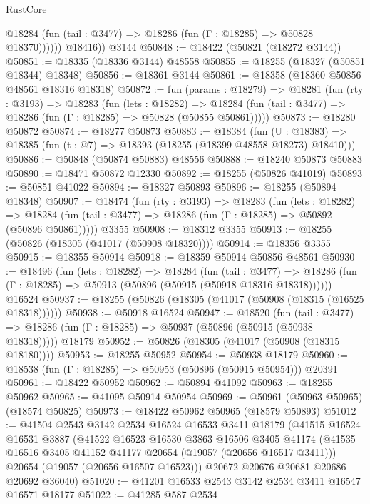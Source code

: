 \begin{lexlean}{RustCore}
\begin{coremodule}
              @18284 (fun (tail : @3477) => @18286 (fun (Γ : @18285) => @50828 @18370))))))
        @18416))
    @3144
@50848 := @18422 (@50821 (@18272 @3144))
@50851 := @18335 (@18336 @3144) @48558
@50855 := @18255 (@18327 (@50851 @18344) @18348)
@50856 := @18361 @3144
@50861 := @18358 (@18360 @50856 @48561 @18316 @18318)
@50872 := fun (params : @18279) =>
  @18281
    (fun (rty : @3193) =>
    @18283
      (fun (lets : @18282) =>
      @18284 (fun (tail : @3477) => @18286 (fun (Γ : @18285) => @50828 (@50855 @50861)))))
@50873 := @18280 @50872
@50874 := @18277 @50873
@50883 := @18384
    (fun (U : @18383) => @18385 (fun (t : @7) => @18393 (@18255 (@18399 @48558 @18273) @18410)))
@50886 := @50848 (@50874 @50883) @48556
@50888 := @18240 @50873 @50883
@50890 := @18471 @50872 @12330
@50892 := @18255 (@50826 @41019)
@50893 := @50851 @41022
@50894 := @18327 @50893
@50896 := @18255 (@50894 @18348)
@50907 := @18474
    (fun (rty : @3193) =>
    @18283
      (fun (lets : @18282) =>
      @18284 (fun (tail : @3477) => @18286 (fun (Γ : @18285) => @50892 (@50896 @50861)))))
    @3355
@50908 := @18312 @3355
@50913 := @18255 (@50826 (@18305 (@41017 (@50908 @18320))))
@50914 := @18356 @3355
@50915 := @18355 @50914
@50918 := @18359 @50914 @50856 @48561
@50930 := @18496
    (fun (lets : @18282) =>
    @18284
      (fun (tail : @3477) =>
      @18286 (fun (Γ : @18285) => @50913 (@50896 (@50915 (@50918 @18316 @18318))))))
    @16524
@50937 := @18255 (@50826 (@18305 (@41017 (@50908 (@18315 (@16525 @18318))))))
@50938 := @50918 @16524
@50947 := @18520
    (fun (tail : @3477) => @18286 (fun (Γ : @18285) => @50937 (@50896 (@50915 (@50938 @18318)))))
    @18179
@50952 := @50826 (@18305 (@41017 (@50908 (@18315 @18180))))
@50953 := @18255 @50952
@50954 := @50938 @18179
@50960 := @18538 (fun (Γ : @18285) => @50953 (@50896 (@50915 @50954))) @20391
@50961 := @18422 @50952
@50962 := @50894 @41092
@50963 := @18255 @50962
@50965 := @41095 @50914 @50954
@50969 := @50961 (@50963 @50965) (@18574 @50825)
@50973 := @18422 @50962 @50965 (@18579 @50893)
@51012 := @41504
    @2543
    @3142
    @2534
    @16524
    @16533
    @3411
    @18179
    (@41515
      @16524
      @16531
      @3887
      (@41522
        @16523
        @16530
        @3863
        @16506
        @3405
        @41174
        (@41535 @16516 @3405 @41152 @41177 @20654 (@19057 (@20656 @16517 @3411)))
        @20654
        (@19057 (@20656 @16507 @16523)))
      @20672
      @20676
      @20681
      @20686
      @20692
      @36040)
@51020 := @41201 @16533 @2543 @3142 @2534 @3411 @16547 @16571 @18177
@51022 := @41285 @587 @2534

\end{coremodule}
\end{lexlean}
